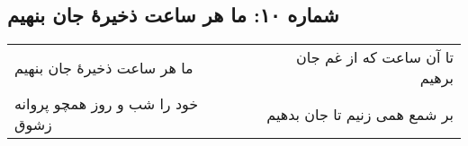 \begin{center}
\section*{شماره ۱۰: ما هر ساعت ذخیرۀ جان بنهیم}
\label{sec:010}
\begin{longtable}{l p{0.5cm} r}
ما هر ساعت ذخیرهٔ جان بنهیم
&&
تا آن ساعت که از غم جان برهیم
\\
خود را شب و روز همچو پروانه زشوق
&&
بر شمع همی زنیم تا جان بدهیم
\\
\end{longtable}
\end{center}
